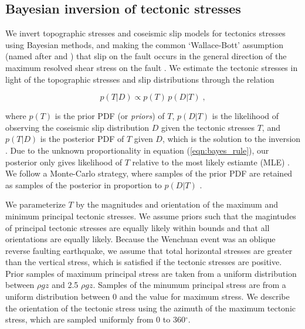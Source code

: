 \documentclass[twocolumn,jgrga]{AGUTeX}
\begin{document}
\begin{article}
\subsection{Bayesian inversion of tectonic
stresses}\label{bayesian-inversion-of-tectonic-stresses}

We invert topographic stresses and coseismic slip models for tectonics
stresses using Bayesian methods, and making the common `Wallace-Bott'
assumption (named after \citet{wallace1951} and \citet{bott1959}) 
that slip on the fault occurs in the general direction
of the maximum resolved shear stress on the fault \citep[e.g.,][]
{mckenzie1969, angelier1994}. We estimate the tectonic stresses in
light of the topographic stresses and slip distributions through the
relation

\begin{equation} 
p(T|D) \propto p(T) \, p(D|T) \; , 
\label{eqn:bayes_rule} 
\end{equation}

where $p(T)$ is the prior PDF (or \emph{priors}) of $T$, $p(D|T)$ is the
likelihood of observing the coseismic slip distribution $D$ given the
tectonic stresses $T$, and $p(T|D)$ is the posterior PDF of $T$ given
$D$, which is the solution to the inversion \citep[e.g.,][]{mosegaard1995}.
Due to the unknown proportionality in equation (\ref{eqn:bayes_rule}),
our posterior only gives likelihood of $T$ relative to the most likely
estiamte (MLE) \citep{tarantola2005}. We follow a Monte-Carlo strategy,
where samples of the prior PDF are retained as samples of the posterior
in proportion to $p(D|T)$ \citep[e.g.,][]{mosegaard1995}.

We parameterize $T$ by the magnitudes and orientation of the maximum and
minimum principal tectonic stresses. We assume priors such that the
magintudes of principal tectonic stresses are equally likely within
bounds and that all orientations are equally likely. Because the
Wenchuan event was an oblique reverse faulting earthquake, we assume
that total horizontal stresses are greater than the vertical stress,
which is satisfied if the tectonic stresses are positive. Prior samples
of maximum principal stress are taken from a uniform distribution
between $\rho g z$ and 2.5 $\rho g z$. Samples of the minumum principal
stress are from a uniform distribution between 0 and the value for
maximum stress. We describe the orientation of the tectonic stress using
the azimuth of the maximum tectonic stress, which are sampled uniformly
from 0 to 360$^{\circ}$.


\end{article}
\end{document}
